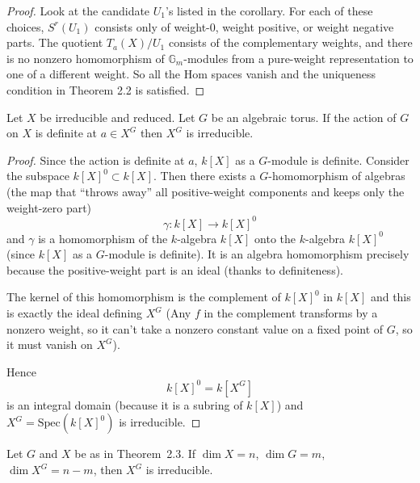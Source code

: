 \documentclass[12pt]{article}
\begin{document}
\begin{proof}
Look at the candidate $U_1$'s listed in the corollary. For each of these choices, $S^r(U_1)$ consists only of weight-0, weight positive, or weight negative parts. The quotient $T_a(X)/U_1$ consists of the complementary weights, and there is no nonzero homomorphism of $\mathbb{G}_m$-modules from a pure-weight representation to one of a different weight. So all the Hom spaces vanish and the uniqueness condition in Theorem 2.2 is satisfied.
\end{proof}

\begin{theorem}[2.3]
Let $X$ be irreducible and reduced. Let $G$ be an algebraic torus. 
If the action of $G$ on $X$ is definite at $a \in X^G$ then $X^G$ is irreducible.
\end{theorem}

\begin{proof}
Since the action is definite at $a$, $k[X]$ as a $G$-module is definite.  
Consider the subspace $k[X]^0 \subset k[X]$. Then there exists a 
$G$-homomorphism of algebras (the map that “throws away” all positive-weight components and keeps only the weight-zero part)
\[
   \gamma : k[X] \longrightarrow k[X]^0
\]
and $\gamma$ is a homomorphism of the $k$-algebra $k[X]$ onto the 
$k$-algebra $k[X]^0$ (since $k[X]$ as a $G$-module is definite). It is an algebra homomorphism precisely because the positive-weight part is an ideal (thanks to definiteness).

The kernel of this homomorphism is the complement of $k[X]^0$ in $k[X]$ 
and this is exactly the ideal defining $X^G$ (Any $f$ in the complement transforms by a nonzero weight, so it can’t take a nonzero constant value on a fixed point of $G$, so it must vanish on $X^G$).

Hence 
\[
   k[X]^0 = k[X^G]
\]
is an integral domain (because it is a subring of $k[X]$) and $X^G = \mathrm{Spec}(k[X]^0)$ is irreducible.
\end{proof}

\begin{corollary}
Let $G$ and $X$ be as in Theorem~2.3. If $\dim X = n$, $\dim G = m$,  $\dim X^G = n-m$, then $X^G$ is irreducible.
\end{corollary}
\end{document}
